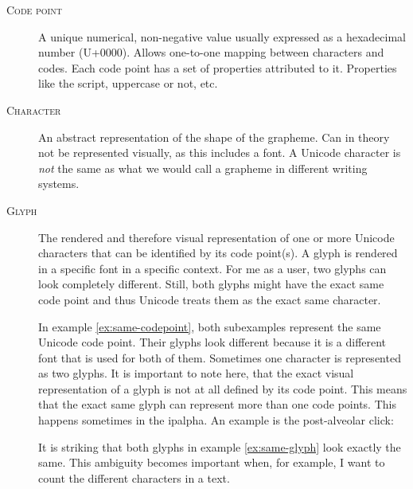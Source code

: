 \begin{description}
\item[\textsc{Code point}] A unique numerical, non-negative value usually expressed as a hexadecimal number (U+0000). Allows one-to-one mapping between characters and codes. Each code point has a set of properties attributed to it. Properties like the script, uppercase or not, etc.
\item[\textsc{Character}] An abstract representation of the shape of the grapheme. Can in theory not be represented visually, as this includes a font. A Unicode character is \textit{not} the same as what we would call a grapheme in different writing systems.
\item[\textsc{Glyph}] The rendered and therefore visual representation of one or more Unicode characters that can be identified by its code point(s). A glyph is rendered in a specific font in a specific context. For me as a user, two glyphs can look completely different. Still, both glyphs might have the exact same code point and thus Unicode treats them as the exact same character. 


In example \ref{ex:same-codepoint}, both subexamples represent the same Unicode code point. Their glyphs look different because it is a different font that is used for both of them.
Sometimes one character is represented as two glyphs. It is important to note here, that the exact visual representation of a glyph is not at all defined by its code point. This means that the exact same glyph can represent more than one code points. This happens sometimes in the \ac{ipalpha}. An example is the post-alveolar click:


It is striking that both glyphs in example \ref{ex:same-glyph} look exactly the same. This ambiguity becomes important when, for example, I want to count the different characters in a text.

\end{description}

